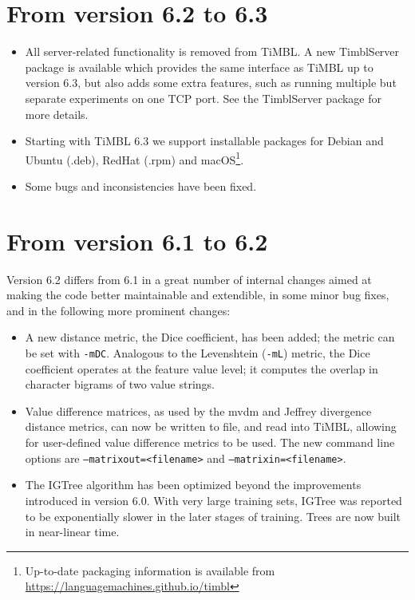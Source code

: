 \documentclass{book}
\begin{document}
\section{From version 6.2 to 6.3}

\begin{itemize}
\item All server-related functionality is removed from TiMBL. A new
  TimblServer package is available which provides the same interface as
  TiMBL up to version 6.3, but also adds some extra features, such as
  running multiple but separate experiments on one TCP port. See
  the TimblServer package for more details.

\item Starting with TiMBL 6.3 we support installable packages for
  Debian and Ubuntu (.deb), RedHat (.rpm) and
  macOS\footnote{Up-to-date packaging information is available from
    \url{https://languagemachines.github.io/timbl}}.

\item Some bugs and inconsistencies have been fixed.

\end{itemize}

\section{From version 6.1 to 6.2}

Version 6.2 differs from 6.1 in a great number of internal changes
aimed at making the code better maintainable and extendible, in some
minor bug fixes, and in the following more prominent changes:

\begin{itemize}

\item A new distance metric, the Dice coefficient, has been added; the
  metric can be set with {\tt -mDC}. Analogous to the Levenshtein
  ({\tt -mL}) metric, the Dice coefficient operates at the feature
  value level; it computes the overlap in character bigrams of two
  value strings.

\item Value difference matrices, as used by the {\sc mvdm} and Jeffrey
  divergence distance metrics, can now be written to file, and read
  into TiMBL, allowing for user-defined value difference metrics to be
  used. The new command line options are {\tt --matrixout=<filename>}
  and {\tt --matrixin=<filename>}.

\item The {\sc IGTree} algorithm has been optimized beyond the
  improvements introduced in version 6.0. With very large training
  sets, {\sc IGTree} was reported to be exponentially slower in the
  later stages of training. Trees are now built in near-linear time.

\end{itemize}
\end{document}
